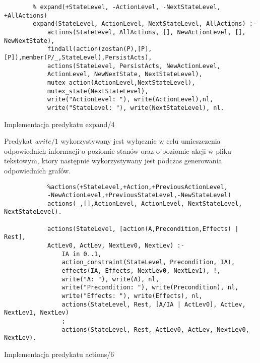     
    \begin{listing}[H]
        \begin{verbatim}
        % expand(+StateLevel, -ActionLevel, -NextStateLevel, +AllActions)
        expand(StateLevel, ActionLevel, NextStateLevel, AllActions) :-
            actions(StateLevel, AllActions, [], NewActionLevel, [], NewNextState),
            findall(action(zostan(P),[P],[P]),member(P/_,StateLevel),PersistActs),
            actions(StateLevel, PersistActs, NewActionLevel, 
            ActionLevel, NewNextState, NextStateLevel),
            mutex_action(ActionLevel,NextStateLevel), 
            mutex_state(NextStateLevel),
            write("ActionLevel: "), write(ActionLevel),nl,
            write("StateLevel: "), write(NextStateLevel), nl.
    \end{verbatim}
    \caption{Implementacja predykatu expand/4}
    \end{listing}

    Predykat $write/1$ wykorzystywany jest wyłącznie w celu umieszczenia odpowiednich informacji o poziomie stanów oraz o poziomie akcji w pliku
    tekstowym, ktory następnie wykorzystywany jest podczas generowania odpowiednich grafów.

    \begin{listing}[H]
        \begin{verbatim}
            %actions(+StateLevel,+Action,+PreviousActionLevel,
            -NewActionLevel,+PreviousStateLevel,-NewStateLevel)
            actions(_,[],ActionLevel, ActionLevel, NextStateLevel, NextStateLevel).

            actions(StateLevel, [action(A,Precondition,Effects) | Rest], 
            ActLev0, ActLev, NextLev0, NextLev) :-
                IA in 0..1, 
                action_constraint(StateLevel, Precondition, IA),
                effects(IA, Effects, NextLev0, NextLev1), !, 
                write("A: "), write(A), nl,
                write("Precondition: "), write(Precondition), nl,
                write("Effects: "), write(Effects), nl,
                actions(StateLevel, Rest, [A/IA | ActLev0], ActLev, NextLev1, NextLev)
                ;
                actions(StateLevel, Rest, ActLev0, ActLev, NextLev0, NextLev).
    \end{verbatim}
    \caption{Implementacja predykatu actions/6}
    \end{listing}

